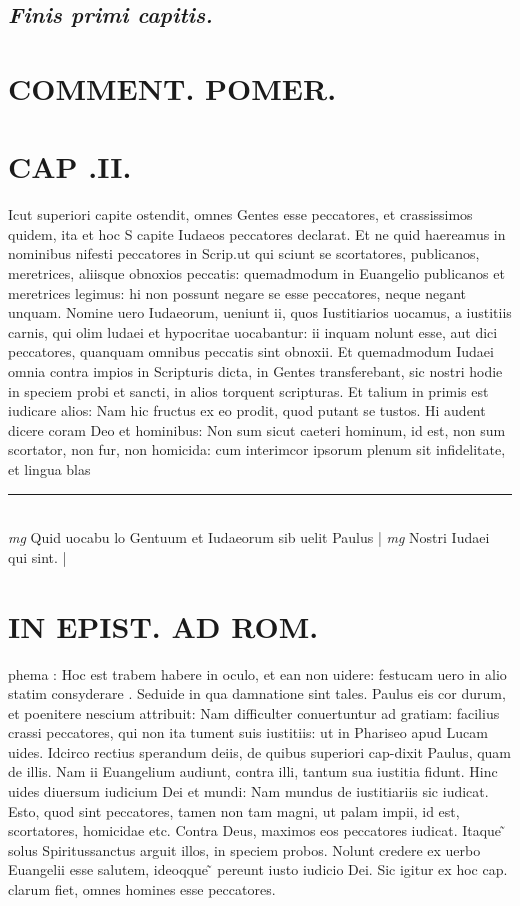 \documentclass{article}
\begin{document}
\begin{pages}
\subsection*{\textit{Finis primi capitis.  }}
\section*{COMMENT. POMER.  }
\section*{CAP .II. }\pstart Icut superiori capite ostendit, omnes Gentes esse peccatores, et crassissimos quidem, ita et hoc S capite Iudaeos peccatores declarat. Et ne quid haereamus in nominibus     nifesti peccatores in Scrip.ut qui sciunt se scortatores, publicanos, meretrices, aliisque obnoxios peccatis: quemadmodum in Euangelio publicanos et meretrices legimus: hi non possunt negare se esse peccatores, neque negant unquam. Nomine uero Iudaeorum, ueniunt ii, quos Iustitiarios uocamus, a iustitiis carnis, qui olim ludaei et hypocritae uocabantur: ii inquam nolunt esse, aut dici peccatores, quanquam omnibus peccatis sint obnoxii. Et quemadmodum Iudaei omnia contra impios in Scripturis dicta, in Gentes transferebant, sic nostri hodie in speciem probi et sancti, in alios torquent scripturas. Et talium in primis est iudicare alios: Nam hic fructus ex eo prodit, quod putant se tustos. Hi audent dicere coram Deo et hominibus: Non sum sicut caeteri hominum, id est, non sum scortator, non fur, non homicida: cum interimcor ipsorum plenum sit infidelitate, et lingua blas\pend
\vspace{0.5cm}\noindent
\vspace{0.2cm}\rule{1cm}{0.2pt}\\ 
\hspace{0.2cm}\textit{mg}
\footnotesize Quid uocabu lo Gentuum et Iudaeorum sib uelit Paulus 
\normalsize| 
\hspace{0.2cm}\textit{mg}
\footnotesize Nostri Iudaei qui sint.  
\normalsize| 
\section*{IN EPIST. AD ROM.  }
\marginpar{[ p.13 ]}\pstart phema : Hoc est trabem habere in oculo, et ean non uidere: festucam uero in alio statim consyderare . Seduide in qua damnatione sint tales. Paulus eis cor durum, et poenitere nescium attribuit: Nam difficulter conuertuntur ad gratiam: facilius crassi peccatores, qui non ita tument suis iustitiis: ut in Phariseo apud Lucam uides. Idcirco rectius sperandum deiis, de quibus superiori cap-dixit Paulus, quam de illis. Nam ii Euangelium audiunt, contra illi, tantum sua iustitia fidunt. Hinc uides diuersum iudicium Dei et mundi: Nam mundus de iustitiariis sic iudicat.  Esto, quod sint peccatores, tamen non tam magni, ut palam impii, id est, scortatores, homicidae etc. Contra Deus, maximos eos peccatores iudicat. Itaque ̃ solus Spiritussanctus arguit illos, in speciem probos. Nolunt credere ex uerbo Euangelii esse salutem, ideoqque ̃ pereunt iusto iudicio Dei. Sic igitur ex hoc cap. clarum fiet, omnes homines esse peccatores.   \pend
{}
{}

\end{pages}
\end{document}
